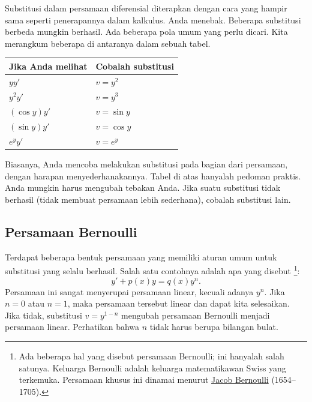 \medskip

Substitusi dalam persamaan diferensial diterapkan dengan cara yang hampir sama seperti
penerapannya dalam kalkulus. Anda menebak. Beberapa substitusi berbeda mungkin
berhasil. Ada beberapa pola umum yang perlu dicari. Kita merangkum beberapa
di antaranya dalam sebuah tabel.

\begin{center}
\begin{tabular}{@{}ll@{}}
\toprule
Jika Anda melihat & Cobalah substitusi \\
\midrule
$yy'$ & $v=y^2$ \\
$y^2y'$ & $v=y^3$ \\
$(\cos y)y'$ & $v=\sin y$ \\
$(\sin y)y'$ & $v=\cos y$ \\
$e^y y'$ & $v=e^y$ \\ \bottomrule
\end{tabular}
\end{center}

Biasanya, Anda mencoba melakukan substitusi pada bagian  dari
persamaan, dengan harapan menyederhanakannya. Tabel di atas hanyalah pedoman
praktis. Anda mungkin harus mengubah tebakan Anda. Jika suatu substitusi
tidak berhasil (tidak membuat persamaan lebih sederhana), cobalah substitusi lain.

\subsection{Persamaan Bernoulli}

Terdapat beberapa bentuk persamaan yang memiliki
aturan umum untuk substitusi yang selalu berhasil.
Salah satu contohnya adalah apa yang disebut
\emph{}%
\footnote{Ada beberapa hal yang disebut persamaan Bernoulli; ini hanyalah salah
satunya. Keluarga Bernoulli adalah keluarga matematikawan Swiss yang terkemuka. Persamaan
khusus ini dinamai menurut
\href{https://en.wikipedia.org/wiki/Jacob_Bernoulli}{Jacob Bernoulli} (1654--1705).}:
\begin{equation*}
y' + p(x)y = q(x)y^n .
\end{equation*}
Persamaan ini
sangat menyerupai persamaan linear, kecuali adanya $y^n$. Jika $n=0$ atau
$n=1$, maka persamaan tersebut linear dan dapat kita selesaikan. Jika tidak,
substitusi $v=y^{1-n}$ mengubah
persamaan Bernoulli menjadi persamaan linear. Perhatikan bahwa $n$
tidak harus berupa bilangan bulat.

